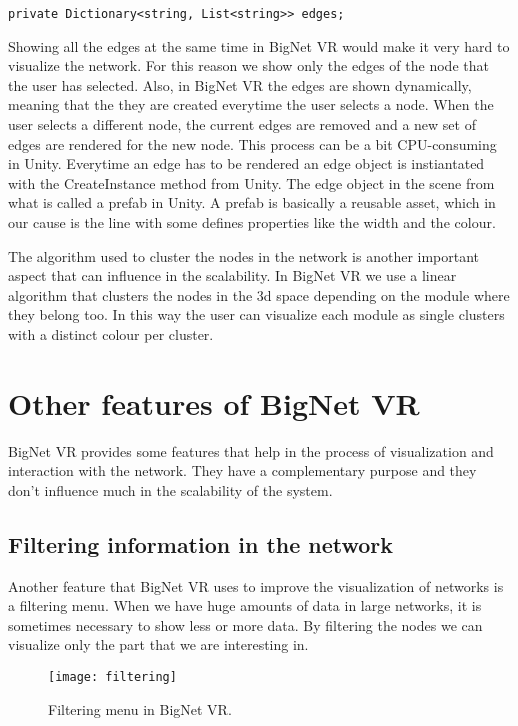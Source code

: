 \begin{verbatim}
private Dictionary<string, List<string>> edges;
\end{verbatim}

Showing all the edges at the same time in BigNet VR would make it very hard to visualize the network. For this reason we show only the edges of the node that the user has selected. Also, in BigNet VR the edges are shown dynamically, meaning that the they are created everytime the user selects a node. When the user selects a different node, the current edges are removed and a new set of edges are rendered for the new node. This process can be a bit CPU-consuming in Unity. Everytime an edge has to be rendered an edge object is instiantated with the CreateInstance method from Unity. The edge object in the scene from what is called a prefab in Unity. A prefab\cite{prefab} is basically a reusable asset, which in our cause is the line with some defines properties like the width and the colour.

The algorithm used to cluster the nodes in the network is another important aspect that can influence in the scalability. In BigNet VR we use a linear algorithm that clusters the nodes in the 3d space depending on the module where they belong too. In this way the user can visualize each module as single clusters with a distinct colour per cluster.

\section{Other features of BigNet VR}
BigNet VR provides some features that help in the process of visualization and interaction with the network. They have a complementary purpose and they don't influence much in the scalability of the system.

\subsection{Filtering information in the network}
Another feature that BigNet VR uses to improve the visualization of networks is a filtering menu. When we have huge amounts of data in large networks, it is sometimes necessary to show less or more data. By filtering the nodes we can visualize only the part that we are interesting in.

\begin{figure}[h!]
    \centering%
    \texttt{[image: filtering]}
    \caption{Filtering menu in BigNet VR.}
    \label{fig:filtering}
\end{figure}%

